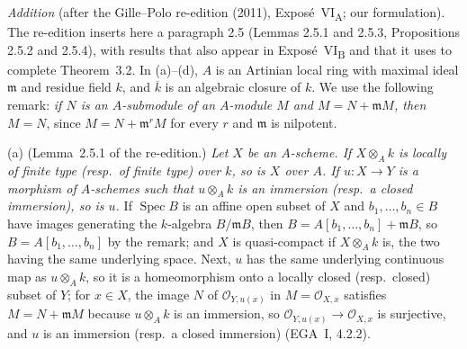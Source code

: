 
\medskip\noindent
\emph{Addition} (after the Gille--Polo re-edition (2011), Exposé~VI\textsubscript{A}; our
formulation). The re-edition inserts here a paragraph 2.5 (Lemmas 2.5.1 and 2.5.3, Propositions
2.5.2 and 2.5.4), with results that also appear in Exposé~VI\textsubscript{B} and that it uses to
complete Theorem~3.2. In (a)--(d), \(A\) is an Artinian local ring with maximal ideal
\(\mathfrak m\) and residue field \(k\), and \(\overline k\) is an algebraic closure of \(k\). We use
the following remark: \emph{if \(N\) is an \(A\)-submodule of an \(A\)-module \(M\) and
\(M=N+\mathfrak mM\), then \(M=N\)}, since \(M=N+\mathfrak m^rM\) for every \(r\) and \(\mathfrak m\)
is nilpotent.

\label{lem:sga3-VIA-2.5.1}%
(a) (Lemma~2.5.1 of the re-edition.) \emph{Let \(X\) be an \(A\)-scheme. If \(X\otimes_Ak\) is
locally of finite type \textup{(}resp.\ of finite type\textup{)} over \(k\), so is \(X\) over \(A\).
If \(u\colon X\to Y\) is a morphism of \(A\)-schemes such that \(u\otimes_Ak\) is an immersion
\textup{(}resp.\ a closed immersion\textup{)}, so is \(u\).} If \(\operatorname{Spec}B\) is an affine
open subset of \(X\) and \(b_1,\dots,b_n\in B\) have images generating the \(k\)-algebra
\(B/\mathfrak mB\), then \(B=A[b_1,\dots,b_n]+\mathfrak mB\), so \(B=A[b_1,\dots,b_n]\) by the remark;
and \(X\) is quasi-compact if \(X\otimes_Ak\) is, the two having the same underlying space. Next,
\(u\) has the same underlying continuous map as \(u\otimes_Ak\), so it is a homeomorphism onto a
locally closed \textup{(}resp.\ closed\textup{)} subset of \(Y\); for \(x\in X\), the image \(N\) of
\(\mathcal O_{Y,u(x)}\) in \(M=\mathcal O_{X,x}\) satisfies \(M=N+\mathfrak mM\) because
\(u\otimes_Ak\) is an immersion, so \(\mathcal O_{Y,u(x)}\to\mathcal O_{X,x}\) is surjective, and
\(u\) is an immersion \textup{(}resp.\ a closed immersion\textup{)} (EGA~I, 4.2.2).

